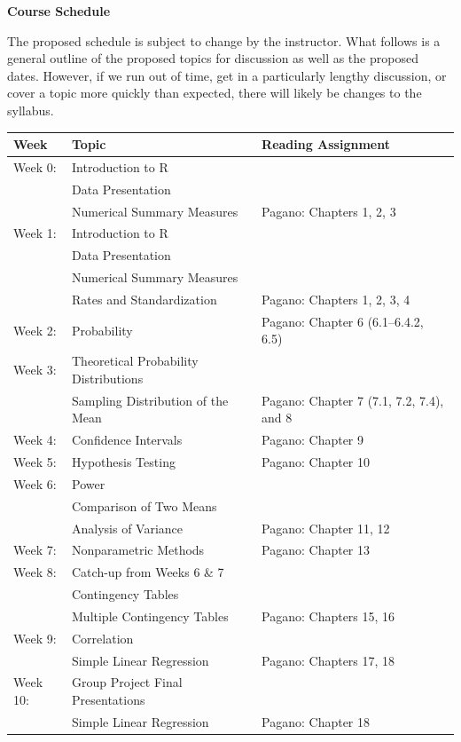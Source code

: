 \documentclass[11pt]{article}
\begin{document}
\vspace{8pt}

\noindent\textbf{Course Schedule}

The proposed schedule is subject to change by the instructor. What follows is a general outline of the proposed topics for discussion as well as the proposed dates. However, if we run out of time, get in a particularly lengthy discussion, or cover a topic more quickly than expected, there will likely be changes to the syllabus.
\begin{center}
\begin{tabular}{p{1.5cm}p{5.5cm}p{5cm}}
\toprule
\textbf{Week} & \textbf{Topic} & \textbf{Reading Assignment} \\
\midrule
Week 0: & Introduction to R\\
& Data Presentation\\
& Numerical Summary Measures & Pagano: Chapters 1, 2, 3 \\
\midrule
Week 1: & Introduction to R\\
& Data Presentation\\
& Numerical Summary Measures\\
& Rates and Standardization & Pagano: Chapters 1, 2, 3, 4 \\
\midrule
Week 2: & Probability & Pagano: Chapter 6 (6.1--6.4.2, 6.5) \\
\midrule
Week 3: & Theoretical Probability Distributions\\
& Sampling Distribution of the Mean & Pagano: Chapter 7 (7.1, 7.2, 7.4), and 8 \\
\midrule
Week 4: & Confidence Intervals & Pagano: Chapter 9 \\
\midrule
Week 5: & Hypothesis Testing & Pagano: Chapter 10 \\
\midrule
Week 6: & Power\\
& Comparison of Two Means\\
& Analysis of Variance & Pagano: Chapter 11, 12 \\
\midrule
Week 7: & Nonparametric Methods & Pagano: Chapter 13 \\
\midrule
Week 8: & Catch-up from Weeks 6 \& 7\\
& Contingency Tables\\
& Multiple Contingency Tables & Pagano: Chapters 15, 16 \\
\midrule
Week 9: & Correlation\\
& Simple Linear Regression & Pagano: Chapters 17, 18 \\
\midrule
Week 10: & Group Project Final Presentations\\
& Simple Linear Regression & Pagano: Chapter 18 \\
\midrule
\end{tabular}
\end{center}
\end{document}
